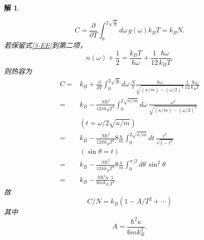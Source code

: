 \documentclass[UTF8,10pt,a4paper]{article}
\theoremstyle{Problem}
\theoremstyle{Solution}
\newtheorem*{sol}{解}
\begin{document}
\begin{sol}
\begin{enumerate}
\begin{equation}
            C=\frac{\partial}{\partial T}\int_0^{2\sqrt{\frac{\kappa}{m}}}d\omega\,g(\omega)k_BT=k_BN.
        \end{equation}
        若保留式\eqref{3-EE}到第二项，
        \begin{equation}
            n(\omega)+\frac{1}{2}=\frac{k_BT}{\hbar\omega}+\frac{1}{12}\frac{\hbar\omega}{k_BT}.
        \end{equation}
        则热容为
        \begin{align}
            \nonumber C=&k_B+\frac{\partial}{\partial T}\int_0^{2\sqrt{\frac{\kappa}{m}}}d\omega\,\frac{N}{\pi}\frac{\hbar\omega}{\sqrt{(\kappa/m)-(\omega/2)^2}}\frac{1}{12}\frac{\hbar\omega}{k_BT}\\
            \nonumber=&k_B-\frac{N\hbar^2}{12\pi k_BT^2}\int_0^{2\sqrt{\kappa/m}}d\omega\,\frac{\omega^2}{\sqrt{(\kappa/m)-(\omega/2)^2}}\\
            \nonumber&(t=\omega/2\sqrt{\kappa/m})\\
            \nonumber=&k_B-\frac{N\hbar^2}{12\pi k_BT^2}8\frac{\kappa}{m}\int_0^{2\sqrt{\kappa/m}}dt\,\frac{t^2}{\sqrt{1-t^2}}\\
            \nonumber&(\sin\theta=t)\\
            \nonumber=&k_B-\frac{N\hbar^2}{12\pi k_BT^2}8\frac{\kappa}{m}\int_0^{\pi/2}d\theta\,\sin^2\theta\\
            \nonumber=&k_B-\frac{N\hbar^2\kappa}{6mk_B}\frac{1}{T^2}.
        \end{align}
        故
        \begin{equation}
            C/N=k_B(1-A/T^2+\cdots)
        \end{equation}
        其中
        \begin{equation}
            A=\frac{\hbar^2\kappa}{6mk_B^2}.
        \end{equation}
    \end{enumerate}
\end{sol}
\end{document}
